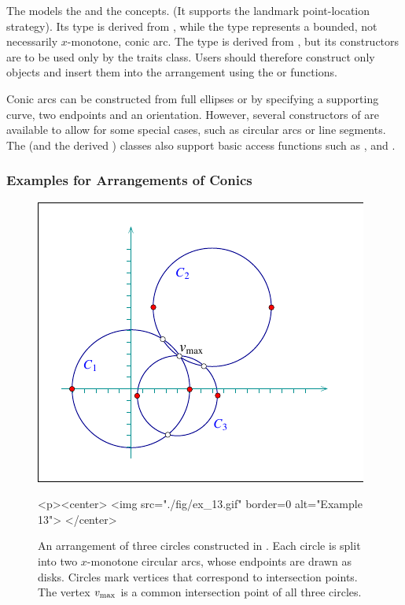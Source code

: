 The  models the  and
the  concepts. (It supports
the landmark point-location strategy). Its  type is
derived from , while the 
type represents a bounded, not necessarily $x$-monotone, conic arc.
The  type is derived from ,
but its constructors are to be used only by the traits class.
Users should therefore construct only  objects and
insert them into the arrangement using the 
or  functions.

Conic arcs can be constructed from full ellipses or by specifying
a supporting curve, two endpoints and an orientation. However,
several constructors of  are available to allow for some
special cases, such as circular arcs or line segments. The
 (and the derived ) classes
also support basic access functions such as ,
 and .

\subsubsection{Examples for Arrangements of Conics}
%
\begin{figure}[!htp]
\begin{ccTexOnly}
  \begin{center}
  \includegraphics{Arrangement_2/fig/ex_13}
  \end{center}
\end{ccTexOnly}
\begin{ccHtmlOnly}
  <p><center>
  <img src="./fig/ex_13.gif" border=0 alt="Example 13">
  </center>
\end{ccHtmlOnly}
\caption{An arrangement of three circles constructed in
. Each circle is split into two $x$-monotone
circular arcs, whose endpoints are drawn as disks. Circles
mark vertices that correspond to intersection points. The vertex
$v_{\rm max}$ is a common intersection point of all three
circles.}
\label{arr_fig:ex_13}
\end{figure}


